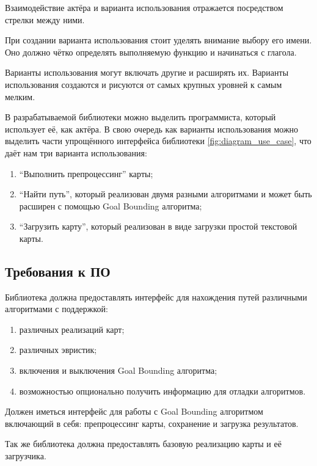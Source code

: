 Взаимодействие актёра и варианта использования отражается посредством стрелки между ними.

При создании варианта использования стоит уделять внимание выбору его имени. Оно должно чётко определять выполняемую функцию и начинаться с глагола. 

Варианты использования могут включать другие и расширять их. Варианты использования создаются и рисуются от самых крупных уровней к самым мелким.

В разрабатываемой библиотеки можно выделить программиста, который использует её, как актёра. В свою очередь как варианты использования можно выделить части упрощённого интерфейса библиотеки \cref{fig:diagram_use_case}, что даёт нам три варианта использования: 

\begin{enumerate}
	\item ``Выполнить препроцессинг'' карты;
	\item ``Найти путь'', который реализован двумя разными алгоритмами и может быть расширен с помощью Goal Bounding алгоритма;
	\item ``Загрузить карту'', который реализован в виде загрузки простой текстовой карты.
\end{enumerate}


\subsection{Требования к ПО}

Библиотека должна предоставлять интерфейс для нахождения путей различными алгоритмами с поддержкой:

\begin{enumerate}
	\item различных реализаций карт;
	\item различных эвристик;
	\item включения и выключения Goal Bounding алгоритма;
	\item возможностью опционально получить информацию для отладки алгоритмов.
\end{enumerate}

Должен иметься интерфейс для работы с Goal Bounding алгоритмом включающий в себя: препроцессинг карты, сохранение и загрузка результатов.

Так же библиотека должна предоставлять базовую реализацию карты и её загрузчика.

